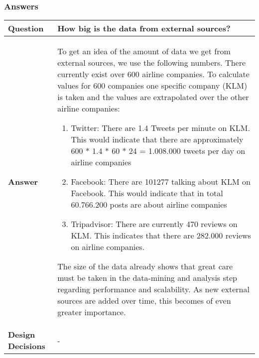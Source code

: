 \subsubsection{Answers}
\begin{longtable}{| l |  p{12cm} |}
\hline
\textbf{Question} & \textbf{How big is the data from external sources?} \\ \hline
\textbf{Answer} &
	To get an idea of the amount of data we get from external sources, we use the following numbers. There currently exist over 600 airline companies. To calculate values for 600 companies one specific company (KLM) is taken and the values are extrapolated over the other airline companies:
\begin{enumerate}
\item Twitter: There are 1.4 Tweets per minute on KLM. This would indicate that there are approximately 600 * 1.4 * 60 * 24 = 1.008.000 tweets per day on airline companies
\item Facebook: There are 101277 talking about KLM on Facebook. This would indicate that in total 60.766.200 posts are about airline companies
\item Tripadvisor: There are currently 470 reviews on KLM. This indicates that there are 282.000 reviews on airline companies.
\end{enumerate}
The size of the data already shows that great care must be taken in the data-mining and analysis step regarding performance and scalability. As new external sources are added over time, this becomes of even greater importance. \\ \hline
\textbf{Design Decisions} & - \\ \hline
\end{longtable}

